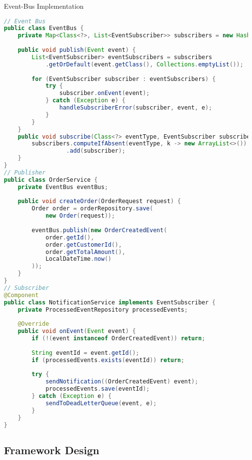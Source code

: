 \begin{example2}{Event-Bus Implementation}
\begin{lstlisting}[language=Java, style=basesmol]
// Event Bus
public class EventBus {
    private Map<Class<?>, List<EventSubscriber>> subscribers = new HashMap<>();
    
    public void publish(Event event) {
        List<EventSubscriber> eventSubscribers = subscribers
            .getOrDefault(event.getClass(), Collections.emptyList());
            
        for (EventSubscriber subscriber : eventSubscribers) {
            try {
                subscriber.onEvent(event);
            } catch (Exception e) {
                handleSubscriberError(subscriber, event, e);
            }
        }
    }
    public void subscribe(Class<?> eventType, EventSubscriber subscriber) {
        subscribers.computeIfAbsent(eventType, k -> new ArrayList<>())
                  .add(subscriber);
    }
}
// Publisher
public class OrderService {
    private EventBus eventBus;
    
    public void createOrder(OrderRequest request) {
        Order order = orderRepository.save(
            new Order(request));
            
        eventBus.publish(new OrderCreatedEvent(
            order.getId(),
            order.getCustomerId(),
            order.getTotalAmount(),
            LocalDateTime.now()
        ));
    }
}
// Subscriber
@Component
public class NotificationService implements EventSubscriber {
    private ProcessedEventRepository processedEvents;
    
    @Override
    public void onEvent(Event event) {
        if (!(event instanceof OrderCreatedEvent)) return;
        
        String eventId = event.getId();
        if (processedEvents.exists(eventId)) return;
        
        try {
            sendNotification((OrderCreatedEvent) event);
            processedEvents.save(eventId);
        } catch (Exception e) {
            sendToDeadLetterQueue(event, e);
        }
    }
}
\end{lstlisting}
\end{example2}

\subsection{Framework Design}

